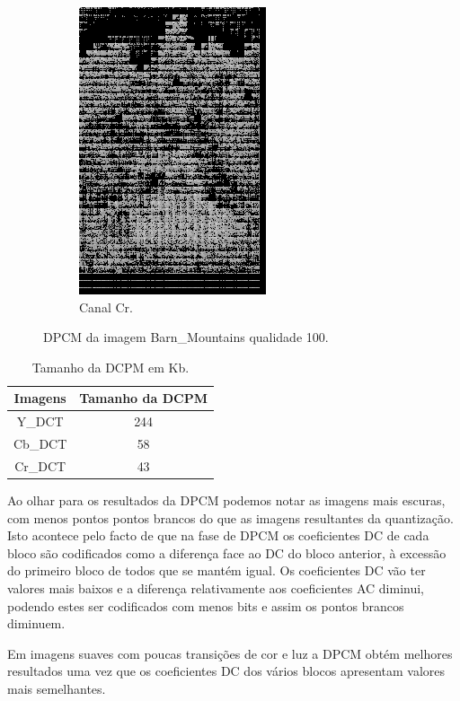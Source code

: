 \documentclass[a4paper, 12pt]{article}
\begin{document}
\begin{figure}[H]
\begin{subfigure}{0.3\textwidth}
                \centering
                \includegraphics[scale=0.5]{resources/DPCM/CR_DPCM100.png} 
                \caption{ Canal Cr.}
            \end{subfigure}
            \caption{\label{fig:my_label} DPCM da imagem Barn\_Mountains qualidade 100.}
        \end{figure}

        \begin{table}[H]
            \centering
            \addtolength\tabcolsep{20pt}
            \begin{tabular}{||c | c ||} 
                \hline
                Imagens & Tamanho da DCPM \\
                \hline\hline
                Y\_DCT  & 244 \\
                Cb\_DCT & 58  \\
                Cr\_DCT & 43  \\
                \hline
            \end{tabular}
            \caption{\label{demo-table} Tamanho da DCPM em Kb.}
        \end{table}
    Ao olhar para os resultados da DPCM podemos notar as imagens mais escuras, com menos pontos pontos brancos do que as imagens resultantes da quantização. Isto acontece pelo facto de que na fase de DPCM os coeficientes DC de cada bloco são codificados como a diferença face ao DC do bloco anterior, à excessão do primeiro bloco de todos que se mantém igual. Os coeficientes DC vão ter valores mais baixos e a diferença relativamente aos coeficientes AC diminui, podendo estes ser codificados com menos bits e assim os pontos brancos diminuem.
    
    Em imagens suaves com poucas transições de cor e luz a DPCM obtém melhores resultados uma vez que os coeficientes DC dos vários blocos apresentam valores mais semelhantes.
\end{document}
